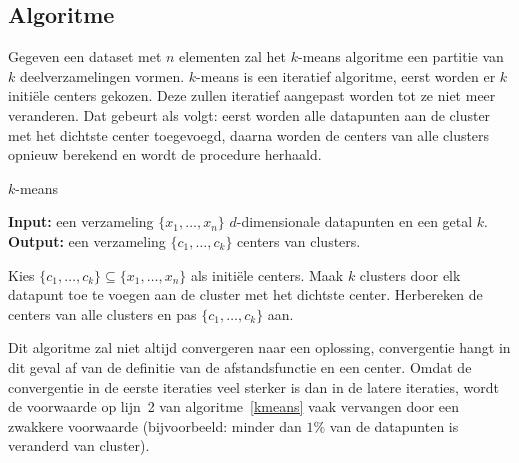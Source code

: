 \documentclass[a4paper,12pt]{article}
\theoremstyle{definition}
\begin{document}
\subsection{Algoritme}


Gegeven een dataset met $n$ elementen zal het $k$-means
algoritme een partitie van $k$ deelverzamelingen vormen.
$k$-means is een iteratief algoritme, eerst worden er $k$ initiële centers gekozen. Deze zullen
iteratief aangepast worden tot ze niet meer veranderen.
Dat gebeurt als volgt: eerst worden alle datapunten aan de cluster met het dichtste
center toegevoegd, daarna worden de centers van alle clusters opnieuw
berekend en wordt de procedure herhaald.

\begin{algorithm}
\caption{$k$-means}\label{kmeans}
\textbf{Input:} een verzameling $\{x_1, \ldots, x_n\}$ $d$-dimensionale datapunten en een getal $k$.\\
\textbf{Output:} een verzameling $\{c_1, \ldots, c_k\}$ centers van clusters.
\begin{algorithmic}[1]
\State Kies $\{c_1, \ldots, c_k\} \subseteq \{x_1, \ldots, x_n\}$ als initiële
centers.
\State Maak $k$ clusters door elk datapunt toe te voegen aan de cluster met het dichtste center.
\State Herbereken de centers van alle clusters en pas $\{c_1, \ldots, c_k\}$ aan.
\EndWhile
\end{algorithmic}
\end{algorithm}

Dit algoritme zal niet altijd convergeren naar een oplossing, convergentie
hangt in dit geval af van de definitie van de afstandsfunctie en een center.
Omdat de convergentie in de eerste iteraties veel sterker is dan in de latere
iteraties, wordt de voorwaarde op lijn~2 van algoritme~\ref{kmeans} vaak
vervangen door een zwakkere voorwaarde (bijvoorbeeld: minder dan $1\%$ van de
datapunten is veranderd van cluster).
\end{document}
